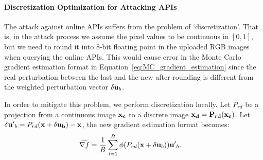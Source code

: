 \paragraph{Discretization Optimization for Attacking APIs}
The attack against online APIs suffers from the problem of `discretization'. That is, in the attack process we assume the pixel values to be continuous in $[0,1]$, but we need to round it into 8-bit floating point in the uploaded RGB images when querying the online APIs.
This would cause error in the Monte Carlo gradient estimation format in Equation~\ref{eq:MC_gradient_estimation} since the real perturbation between the last \boundaryimage and the new \queryimage after rounding is different from the weighted perturbation vector $\delta {\bf u}_b$. 

In order to mitigate this problem, we perform discretization locally. Let $P_{rd}$ be a projection from a continuous image $\bf x_c$ to a discrete image $\bf x_d = P_{rd}(\bf x_c)$. Let $\delta {\bf u'}_b = P_{rd}(\bf x+\delta {\bf u}_b) - x$, the new gradient estimation format becomes:
\begin{align}
    \widetilde{\nabla f} &= \frac1B \sum_{i=1}^B \phi(P_{rd}({\bf x}+\delta {\bf u}_b)) {\bf u'}_b.
\end{align}



